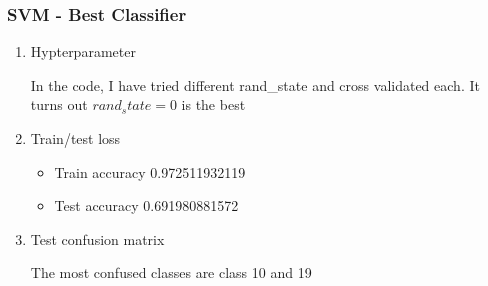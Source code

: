 \documentclass[letterpaper, 12]{article}
\begin{document}
\subsubsection{SVM - Best Classifier}
\begin{enumerate}

    \item Hypterparameter
	
	In the code, I have tried different rand\_state and cross validated each. It turns out $rand_state = 0$ is the best
	
	\item Train/test loss
	\begin{itemize}
     \item  Train accuracy  0.972511932119
     \item Test accuracy 0.691980881572
        \end{itemize}
        \item Test confusion matrix
        
        The most confused classes are class 10 and 19


\end{enumerate}
\end{document}
